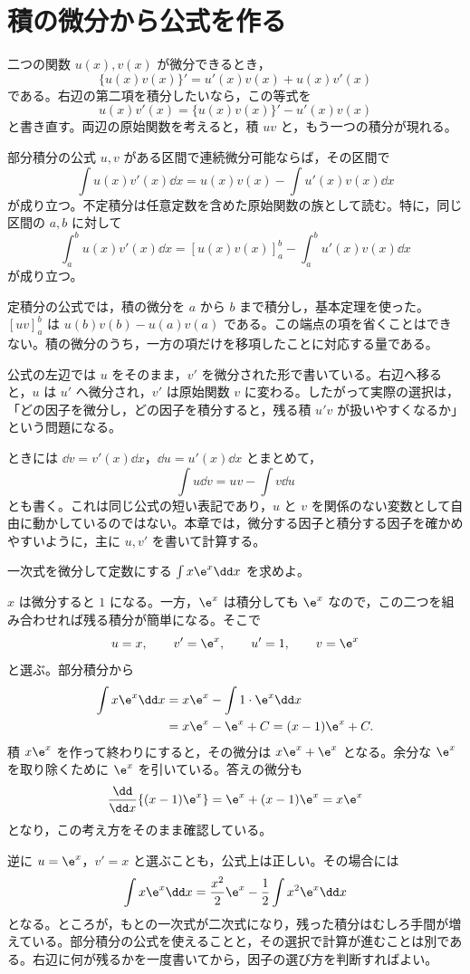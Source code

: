 \section{積の微分から公式を作る}\label{節:部分積分の導出}

二つの関数 $u(x),v(x)$ が微分できるとき，
\[
 \{u(x)v(x)\}'=u'(x)v(x)+u(x)v'(x)
\]
である。右辺の第二項を積分したいなら，この等式を
\[
 u(x)v'(x)=\{u(x)v(x)\}'-u'(x)v(x)
\]
と書き直す。両辺の原始関数を考えると，積 $uv$ と，もう一つの積分が現れる。

\begin{theorem}{部分積分の公式}
$u,v$ がある区間で連続微分可能ならば，その区間で
\[
 \int u(x)v'(x)\dd x
 =u(x)v(x)-\int u'(x)v(x)\dd x
\]
が成り立つ。不定積分は任意定数を含めた原始関数の族として読む。特に，同じ区間の $a,b$ に対して
\[
 \int_a^b u(x)v'(x)\dd x
 =[u(x)v(x)]_a^b-\int_a^b u'(x)v(x)\dd x
\]
が成り立つ。
\end{theorem}

定積分の公式では，積の微分を $a$ から $b$ まで積分し，基本定理を使った。$[uv]_a^b$ は $u(b)v(b)-u(a)v(a)$ である。この端点の項を省くことはできない。積の微分のうち，一方の項だけを移項したことに対応する量である。

公式の左辺では $u$ をそのまま，$v'$ を微分された形で書いている。右辺へ移ると，$u$ は $u'$ へ微分され，$v'$ は原始関数 $v$ に変わる。したがって実際の選択は，「どの因子を微分し，どの因子を積分すると，残る積 $u'v$ が扱いやすくなるか」という問題になる。

ときには $\dd v=v'(x)\dd x$，$\dd u=u'(x)\dd x$ とまとめて，
\[
 \int u\dd v=uv-\int v\dd u
\]
とも書く。これは同じ公式の短い表記であり，$u$ と $v$ を関係のない変数として自由に動かしているのではない。本章では，微分する因子と積分する因子を確かめやすいように，主に $u,v'$ を書いて計算する。

\begin{example}{一次式を微分して定数にする}
$\int x\e^x\dd x$ を求めよ。
\end{example}

$x$ は微分すると $1$ になる。一方，$\e^x$ は積分しても $\e^x$ なので，この二つを組み合わせれば残る積分が簡単になる。そこで
\[
 u=x,\qquad v'=\e^x,
 \qquad u'=1,\qquad v=\e^x
\]
と選ぶ。部分積分から
\[
\begin{aligned}
 \int x\e^x\dd x
 &=x\e^x-\int 1\cdot\e^x\dd x\\
 &=x\e^x-\e^x+C
 =(x-1)\e^x+C.
\end{aligned}
\]
積 $x\e^x$ を作って終わりにすると，その微分は $x\e^x+\e^x$ となる。余分な $\e^x$ を取り除くために $\e^x$ を引いている。答えの微分も
\[
 \frac{\dd}{\dd x}\{(x-1)\e^x\}
 =\e^x+(x-1)\e^x=x\e^x
\]
となり，この考え方をそのまま確認している。

逆に $u=\e^x$，$v'=x$ と選ぶことも，公式上は正しい。その場合には
\[
 \int x\e^x\dd x
 =\frac{x^2}{2}\e^x-\frac12\int x^2\e^x\dd x
\]
となる。ところが，もとの一次式が二次式になり，残った積分はむしろ手間が増えている。部分積分の公式を使えることと，その選択で計算が進むことは別である。右辺に何が残るかを一度書いてから，因子の選び方を判断すればよい。

